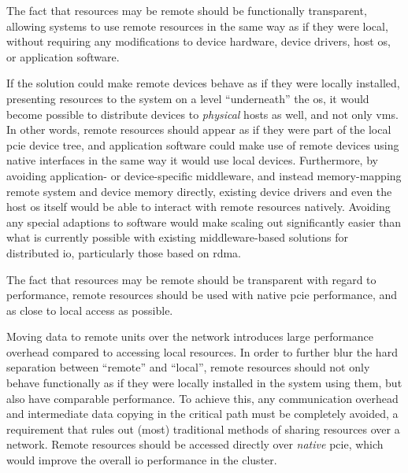 \begin{objective}\label{obj:transparent}
    The fact that resources may be remote should be functionally transparent, allowing systems to use remote resources in the same way as if they were local, without requiring any modifications to device hardware, device drivers, host \gls{os}, or application software.
\end{objective}
If the solution could make remote devices behave as if they were locally installed, presenting resources to the system on a level ``underneath'' the \gls{os}, it would become possible to distribute devices to \emph{physical} hosts as well, and not only \glspl{vm}. 
In other words, remote resources should appear as if they were part of the local \gls{pcie} device tree, and application software could make use of remote devices using native interfaces in the same way it would use local devices.
%
Furthermore, by avoiding application- or device-specific \gls{middleware}, and instead memory-mapping remote system and device memory directly, existing device drivers and even the host \gls{os} itself would be able to interact with remote resources natively.
Avoiding any special adaptions to software would make scaling out significantly easier than what is currently possible with existing \gls{middleware}-based solutions for distributed \gls{io}, particularly those based on \gls{rdma}.



\begin{objective}\label{obj:performance}
    The fact that resources may be remote should be transparent with regard to performance, remote resources should be used with native \gls{pcie} performance, and as close to local access as possible.
\end{objective}
Moving data to remote units over the network introduces large performance overhead compared to accessing local resources. 
In order to further blur the hard separation between ``remote'' and ``local'', remote resources should not only behave functionally as if they were locally installed in the system using them, but also have comparable performance.
To achieve this, any communication overhead and intermediate data copying in the critical path must be completely avoided, a requirement that rules out (most) traditional methods of sharing resources over a network. 
Remote resources should be accessed directly over \emph{native} \gls{pcie}, which would improve the overall \gls{io} performance in the cluster.




